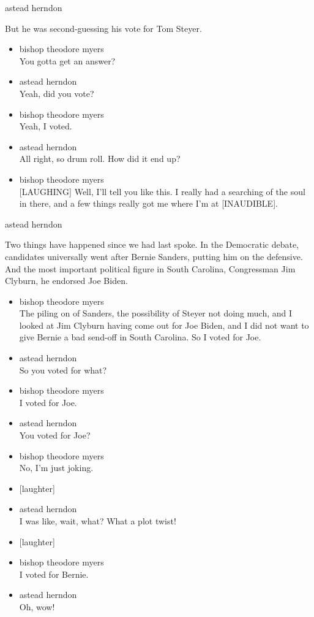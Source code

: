 astead herndon

But he was second-guessing his vote for Tom Steyer.

\begin{itemize}
\item
  bishop theodore myers\\
  You gotta get an answer?
\item
  astead herndon\\
  Yeah, did you vote?
\item
  bishop theodore myers\\
  Yeah, I voted.
\item
  astead herndon\\
  All right, so drum roll. How did it end up?
\item
  bishop theodore myers\\
  {[}LAUGHING{]} Well, I'll tell you like this. I really had a searching
  of the soul in there, and a few things really got me where I'm at
  {[}INAUDIBLE{]}.
\end{itemize}

astead herndon

Two things have happened since we had last spoke. In the Democratic
debate, candidates universally went after Bernie Sanders, putting him on
the defensive. And the most important political figure in South
Carolina, Congressman Jim Clyburn, he endorsed Joe Biden.

\begin{itemize}
\item
  bishop theodore myers\\
  The piling on of Sanders, the possibility of Steyer not doing much,
  and I looked at Jim Clyburn having come out for Joe Biden, and I did
  not want to give Bernie a bad send-off in South Carolina. So I voted
  for Joe.
\item
  astead herndon\\
  So you voted for what?
\item
  bishop theodore myers\\
  I voted for Joe.
\item
  astead herndon\\
  You voted for Joe?
\item
  bishop theodore myers\\
  No, I'm just joking.
\item
  {[}laughter{]}
\item
  astead herndon\\
  I was like, wait, what? What a plot twist!
\item
  {[}laughter{]}
\item
  bishop theodore myers\\
  I voted for Bernie.
\item
  astead herndon\\
  Oh, wow!
\end{itemize}

